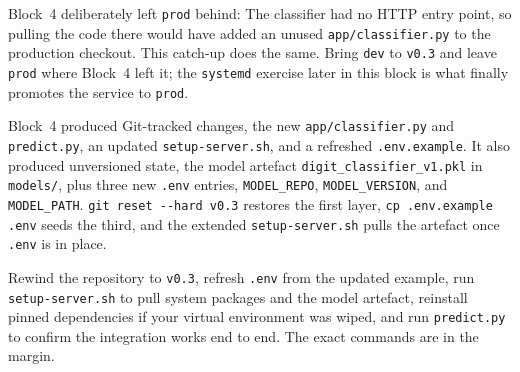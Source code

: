 Block~4 deliberately left \texttt{prod} behind:
The classifier had no HTTP entry point, so pulling the code there would
have added an unused \texttt{app/classifier.py} to the production
checkout. This catch-up does the same. Bring \texttt{dev} to \texttt{v0.3}
and leave \texttt{prod} where Block~4 left it; the \texttt{systemd}
exercise later in this block is what finally promotes the service to
\texttt{prod}.

 Block~4 produced
Git-tracked changes, the new \texttt{app/classifier.py} and
\texttt{predict.py}, an updated \texttt{setup-server.sh}, and a refreshed
\texttt{.env.example}. It also produced unversioned state, the model
artefact \texttt{digit\_classifier\_v1.pkl} in \texttt{models/}, plus
three new \texttt{.env} entries, \texttt{MODEL\_REPO},
\texttt{MODEL\_VERSION}, and \texttt{MODEL\_PATH}. \texttt{git reset
-{}-hard v0.3} restores the first layer,
\texttt{cp .env.example .env} seeds the third, and the extended
\texttt{setup-server.sh} pulls the artefact once \texttt{.env} is in
place.

Rewind the repository to \texttt{v0.3}, refresh \texttt{.env} from the
updated example, run \texttt{setup-server.sh} to pull system packages and
the model artefact, reinstall pinned dependencies if your virtual
environment was wiped, and run \texttt{predict.py} to confirm the
integration works end to end. The exact commands are in the margin.



